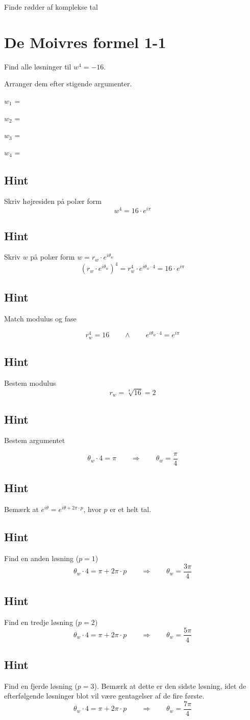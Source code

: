 \documentclass{article}
\newenvironment{exercise}[1]{\newpage\section{#1}}{}
\newcommand{\answerbox}[1]{\fbox{$#1$}}
\newcommand{\hint}{\subsection*{Hint}}
\begin{document}
Finde rødder af komplekse tal
\tableofcontents
\newpage

\begin{exercise}{De Moivres formel 1-1}

Find alle løsninger til $w^4=-16$. 

Arranger dem efter stigende argumenter.

$w_1$ = \answerbox{2 \cdot e^{i \frac{\pi}{4}}}		

$w_2$ = \answerbox{2 \cdot e^{i \frac{3 \pi}{4}}}		

$w_3$ = \answerbox{2 \cdot e^{i \frac{5 \pi}{4}}}		

$w_4$ = \answerbox{2 \cdot e^{i \frac{7 \pi}{4}}}


\hint 

Skriv højresiden på polær form
\[
w^4 = 16 \cdot e^{i \pi}
\]


\hint

Skriv $w$ på polær form $w = r_w \cdot e^{i \theta_w}$
\[
\left(r_w \cdot e^{i \theta_w}\right)^4 = r_w^4 \cdot e^{i \theta_w \cdot 4} = 16 \cdot e^{i \pi}
\]

\hint 
Match modulus og fase

\[
r_w^4 = 16 \qquad \wedge \qquad e^{i \theta_w \cdot 4} = e^{i \pi}
\]

\hint

Bestem modulus
\[
r_w  =  \sqrt[4]{16} = 2
\]

\hint

Bestem argumentet

\[
\theta_w \cdot 4 = \pi \qquad \Rightarrow \qquad  \theta_w = \frac{\pi}{4}
\]

\hint

Bemærk at $e^{i \theta} = e^{i \theta + 2 \pi \cdot p}$, hvor $p$ er et helt tal.

\hint

Find en anden løsning ($p=1$)
\[
\theta_w \cdot 4 = \pi  + 2 \pi \cdot p \qquad \Rightarrow \qquad  \theta_w = \frac{3 \pi}{4}
\]

\hint

Find en tredje løsning ($p=2$)
\[
\theta_w \cdot 4 = \pi  + 2 \pi \cdot p \qquad \Rightarrow  \qquad  \theta_w = \frac{5 \pi}{4}
\]

\hint

Find en fjerde løsning ($p=3$). 
Bemærk at dette er den sidste løsning, idet de efterfølgende 
løsninger blot vil være gentagelser af de fire første. 
\[
\theta_w \cdot 4 = \pi  + 2 \pi \cdot p \qquad \Rightarrow  \qquad  \theta_w = \frac{7 \pi}{4}
\]

\end{exercise}
\end{document}
